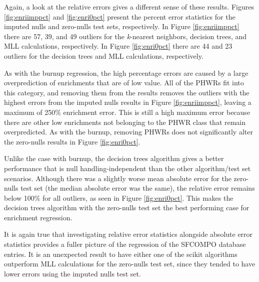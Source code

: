 Again, a look at the relative errors gives a different sense of these results.
Figures \ref{fig:enriimppct} and \ref{fig:enri0pct} present the percent error
statistics for the imputed nulls and zero-nulls test sets, respectively.  In
Figure \ref{fig:enriimppct} there are 57, 39, and 49 outliers for the
\textit{k}-nearest neighbors, decision trees, and \gls{MLL} calculations,
respectively.  In Figure \ref{fig:enri0pct} there are 44 and 23 outliers for
the decision trees and \gls{MLL} calculations, respectively.

As with the burnup regression, the high percentage errors are caused by a large
overprediction of enrichments that are of low value. All of the \gls{PHWR}s fit
into this category, and removing them from the results removes the outliers
with the highest errors from the imputed nulls results in Figure
\ref{fig:enriimppct}, leaving a maximum of 250\% enrichment error. This is
still a high maximum error because there are other low enrichments not
belonging to the \gls{PHWR} class that remain overpredicted.  As with the
burnup, removing \gls{PHWR}s does not significantly alter the zero-nulls
results in Figure \ref{fig:enri0pct}.

Unlike the case with burnup, the decision trees algorithm gives a better
performance that is null handling-independent than the other algorithm/test set
scenarios. Although there was a slightly worse mean absolute error for the
zero-nulls test set (the median absolute error was the same), the relative
error remains below 100\% for all outliers, as seen in Figure
\ref{fig:enri0pct}.  This makes the decision trees algorithm with the
zero-nulls test set the best performing case for enrichment regression.

It is again true that investigating relative error statistics alongside
absolute error statistics provides a fuller picture of the regression of the
\gls{SFCOMPO} database entries.  It is an unexpected result to have either one
of the scikit algorithms outperform \gls{MLL} calculations for the zero-nulls
test set, since they tended to have lower errors using the imputed nulls test
set. 


